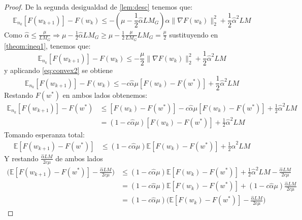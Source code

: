 \documentclass{book}
\theoremstyle{plain}
\theoremstyle{definition}
\theoremstyle{remark}
\begin{document}
\begin{proof}
De la segunda desigualdad de \ref{lem:desc} tenemos que: 
\begin{equation}\label{theom:ineq1}
    \mathbb{E}_{n_k}[F(w_{k+1})] - F(w_k) \leq -(\mu - \frac{1}{2}\hat{\alpha}LM_G)\hat{\alpha}\|\nabla F(w_k)\|_2^2 + \frac{1}{2}\hat{\alpha}^2LM
\end{equation}
Como $\hat{\alpha}\leq\frac{\mu}{L M_G}\Rightarrow \mu - \frac{1}{2}\hat{\alpha}LM_G \geq \mu - \frac{1}{2}\frac{\mu}{L M_G}LM_G = \frac{\mu}{2}$ sustituyendo en \ref{theom:ineq1}, tenemos que: 
\begin{equation}\label{theom:ineq2}
    \mathbb{E}_{n_k}[F(w_{k+1})] - F(w_k) \leq -\frac{\mu}{2}\|\nabla F(w_k)\|_2^2 + \frac{1}{2}\hat{\alpha}^2LM
\end{equation}
y aplicando \ref{eq:convex2} se obtiene
\begin{equation}\label{theom:ineq3}
    \mathbb{E}_{n_k}[F(w_{k+1})] - F(w_k) \leq -c\hat{\alpha}\mu[F(w_k)-F(w^*)] + \frac{1}{2}\hat{\alpha}^2LM
\end{equation}
Restando $F(w^*)$ en ambos lados obtenemos: 
\begin{equation*}
\begin{split}
    \mathbb{E}_{n_k}[F(w_{k+1})] - F(w^*) & \leq [F(w_k)-F(w^*)]-c\hat{\alpha}\mu[ F(w_k) -F(w^*)] + \frac{1}{2}\hat{\alpha}^2LM \\
    & = (1-c\hat{\alpha}\mu)[F(w_k) -F(w^*)] + \frac{1}{2}\hat{\alpha}^2LM
    \end{split}
\end{equation*}
Tomando esperanza total: 
\begin{equation*}
\begin{split}
    \mathbb{E}[F(w_{k+1}) - F(w^*)] & \leq
    (1-c\hat{\alpha}\mu)\mathbb{E}[F(w_k) -F(w^*)] + \frac{1}{2}\hat{\alpha}^2LM
    \end{split}
\end{equation*}
Y restando $\frac{\hat{\alpha}LM}{2c\mu}$ de ambos lados
\begin{equation}\label{theom:compress}
\begin{split}
    \Big(\mathbb{E}[F(w_{k+1}) - F(w^*)] - \frac{\hat{\alpha}LM}{2c\mu}\Big) & \leq
    (1-c\hat{\alpha}\mu)\mathbb{E}[F(w_k) -F(w^*)] + \frac{1}{2}\hat{\alpha}^2LM - \frac{\hat{\alpha}LM}{2c\mu}\\
    & = (1-c\hat{\alpha}\mu)\mathbb{E}[F(w_k) -F(w^*)] + (1-c\hat{\alpha}\mu)\frac{\hat{\alpha}LM}{2c\mu}\\
    & = (1-c\hat{\alpha}\mu)\Big(\mathbb{E}[F(w_k) -F(w^*)]-\frac{\hat{\alpha}LM}{2c\mu}\Big)

\end{split}
\end{equation}
\end{proof}
\end{document}
